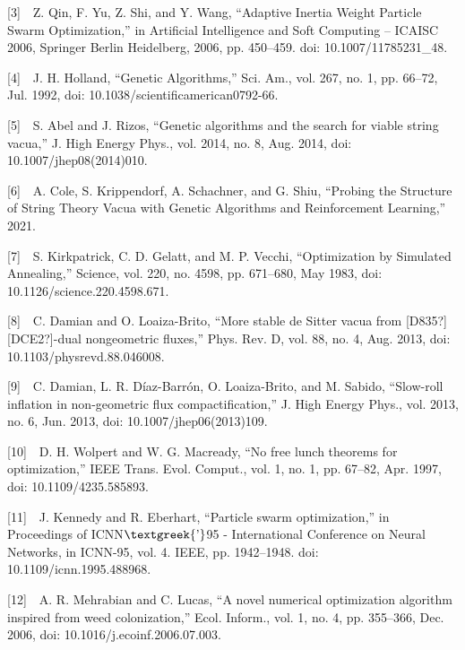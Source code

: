 \documentclass{article}
\begin{document}
[3]\ \ Z. Qin, F. Yu, Z. Shi, and Y. Wang, “Adaptive Inertia Weight Particle Swarm Optimization,” in Artificial
Intelligence and Soft Computing – ICAISC 2006, Springer Berlin Heidelberg, 2006, pp. 450–459. doi:
10.1007/11785231\_48.

[4]\ \ J. H. Holland, “Genetic Algorithms,” Sci. Am., vol. 267, no. 1, pp. 66–72, Jul. 1992, doi:
10.1038/scientificamerican0792-66.

[5]\ \ S. Abel and J. Rizos, “Genetic algorithms and the search for viable string vacua,” J. High Energy Phys., vol.
2014, no. 8, Aug. 2014, doi: 10.1007/jhep08(2014)010.

[6]\ \ A. Cole, S. Krippendorf, A. Schachner, and G. Shiu, “Probing the Structure of String Theory Vacua with Genetic
Algorithms and Reinforcement Learning,” 2021.

[7]\ \ S. Kirkpatrick, C. D. Gelatt, and M. P. Vecchi, “Optimization by Simulated Annealing,” Science, vol. 220, no.
4598, pp. 671–680, May 1983, doi: 10.1126/science.220.4598.671.

[8]\ \ C. Damian and O. Loaiza-Brito, “More stable de Sitter vacua from [D835?][DCE2?]-dual nongeometric fluxes,” Phys.
Rev. D, vol. 88, no. 4, Aug. 2013, doi: 10.1103/physrevd.88.046008.

[9]\ \ C. Damian, L. R. Díaz-Barrón, O. Loaiza-Brito, and M. Sabido, “Slow-roll inflation in non-geometric flux
compactification,” J. High Energy Phys., vol. 2013, no. 6, Jun. 2013, doi: 10.1007/jhep06(2013)109.

[10]\ \ D. H. Wolpert and W. G. Macready, “No free lunch theorems for optimization,” IEEE Trans. Evol. Comput., vol. 1,
no. 1, pp. 67–82, Apr. 1997, doi: 10.1109/4235.585893.

[11]\ \ J. Kennedy and R. Eberhart, “Particle swarm optimization,” in Proceedings of ICNN$\text{\textgreek{’}}$95 -
International Conference on Neural Networks, in ICNN-95, vol. 4. IEEE, pp. 1942–1948. doi: 10.1109/icnn.1995.488968.

[12]\ \ A. R. Mehrabian and C. Lucas, “A novel numerical optimization algorithm inspired from weed colonization,” Ecol.
Inform., vol. 1, no. 4, pp. 355–366, Dec. 2006, doi: 10.1016/j.ecoinf.2006.07.003.
\end{document}
